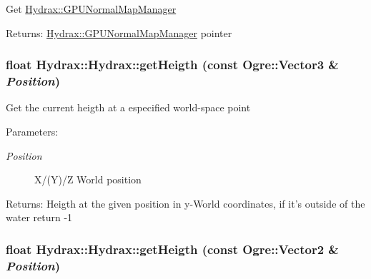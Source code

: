 Get \hyperlink{class_hydrax_1_1_g_p_u_normal_map_manager}{Hydrax::GPUNormalMapManager} \begin{Desc}
\item[Returns:]\hyperlink{class_hydrax_1_1_g_p_u_normal_map_manager}{Hydrax::GPUNormalMapManager} pointer \end{Desc}
\hypertarget{class_hydrax_1_1_hydrax_29fbd3e931c36ef924c38cbe329a4be7}{
\subsubsection[{getHeigth}]{\setlength{\rightskip}{0pt plus 5cm}float Hydrax::Hydrax::getHeigth (const Ogre::Vector3 \& {\em Position})}}
\label{class_hydrax_1_1_hydrax_29fbd3e931c36ef924c38cbe329a4be7}


Get the current heigth at a especified world-space point \begin{Desc}
\item[Parameters:]
\begin{description}
\item[{\em Position}]X/(Y)/Z World position \end{description}
\end{Desc}
\begin{Desc}
\item[Returns:]Heigth at the given position in y-World coordinates, if it's outside of the water return -1 \end{Desc}
\hypertarget{class_hydrax_1_1_hydrax_bbfe63c58bc4f56ad625872b19b51a60}{
\subsubsection[{getHeigth}]{\setlength{\rightskip}{0pt plus 5cm}float Hydrax::Hydrax::getHeigth (const Ogre::Vector2 \& {\em Position})}}
\label{class_hydrax_1_1_hydrax_bbfe63c58bc4f56ad625872b19b51a60}


